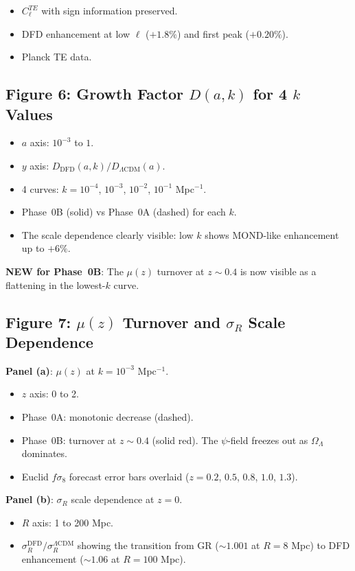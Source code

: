 \documentclass[11pt,a4paper]{article}
\begin{document}
\begin{itemize}
\item $C_\ell^{TE}$ with sign information preserved.
\item DFD enhancement at low $\ell$ ($+1.8\%$) and first peak ($+0.20\%$).
\item Planck TE data.
\end{itemize}

\subsection{Figure 6: Growth Factor $D(a,k)$ for 4 $k$ Values}

\begin{itemize}
\item $a$ axis: $10^{-3}$ to $1$.
\item $y$ axis: $D_{\mathrm{DFD}}(a,k)/D_{\Lambda\mathrm{CDM}}(a)$.
\item 4 curves: $k = 10^{-4}$, $10^{-3}$, $10^{-2}$, $10^{-1}$ Mpc$^{-1}$.
\item Phase~0B (solid) vs Phase~0A (dashed) for each $k$.
\item The scale dependence clearly visible: low $k$ shows MOND-like enhancement up to $+6\%$.
\end{itemize}

\textbf{NEW for Phase~0B}: The $\mu(z)$ turnover at $z \sim 0.4$ is now visible as a flattening in the lowest-$k$ curve.

\subsection{Figure 7: $\mu(z)$ Turnover and $\sigma_R$ Scale Dependence}

\textbf{Panel (a)}: $\mu(z)$ at $k = 10^{-3}$ Mpc$^{-1}$.
\begin{itemize}
\item $z$ axis: 0 to 2.
\item Phase~0A: monotonic decrease (dashed).
\item Phase~0B: turnover at $z \sim 0.4$ (solid red). The $\psi$-field freezes out as $\Omega_\Lambda$ dominates.
\item Euclid $f\sigma_8$ forecast error bars overlaid ($z = 0.2$, $0.5$, $0.8$, $1.0$, $1.3$).
\end{itemize}

\textbf{Panel (b)}: $\sigma_R$ scale dependence at $z = 0$.
\begin{itemize}
\item $R$ axis: 1 to 200 Mpc.
\item $\sigma_R^{\mathrm{DFD}}/\sigma_R^{\Lambda\mathrm{CDM}}$ showing the transition from GR ($\sim 1.001$ at $R = 8$ Mpc) to DFD enhancement ($\sim 1.06$ at $R = 100$ Mpc).
\end{itemize}
\end{document}
